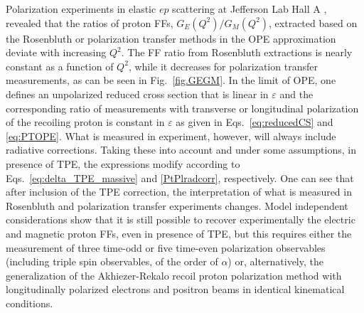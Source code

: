 Polarization experiments in elastic $ep$ scattering at Jefferson Lab Hall A \cite{JeffersonLabHallA:1999epl,Gayou:2001qt,Punjabi:2005wq,Puckett:2011xg}, revealed that the ratios of proton FFs, $G_E(Q^2)/G_M(Q^2)$, extracted based on the Rosenbluth \cite{Rosenbluth:1950yq} or polarization transfer methods \cite{Akhiezer:1968ek,Akhiezer:1974em} in the OPE approximation deviate with increasing $Q^2$. The FF ratio from Rosenbluth extractions is nearly constant as a function of $Q^2$, while it decreases for polarization transfer measurements, as can be seen in Fig.\ \ref{fig.GEGM}. In the limit of OPE, one defines an unpolarized reduced cross section that is linear in $\varepsilon$ and the corresponding ratio of measurements with transverse or longitudinal polarization of the recoiling proton is constant in $\varepsilon$  as given in Eqs.~\ref{eq:reducedCS} and \ref{eq:PTOPE}. What is measured in experiment, however, will always include radiative corrections. Taking these into account and under some assumptions, in presence of TPE, the expressions modify according to Eqs.~\ref{eq:delta_TPE_massive} and \ref{PtPlradcorr}, respectively.
One can see that after inclusion of the TPE correction, the interpretation of what is measured in Rosenbluth and polarization transfer experiments changes.  
Model independent considerations  \cite{Rekalo:2003xa,Rekalo:2003km,Rekalo:2004wa} show that it is still possible to recover experimentally the electric and magnetic proton FFs, even in presence of TPE, but this requires either the measurement of three time-odd or five time-even polarization observables (including triple spin observables, of the order of $\alpha$) or, alternatively, the generalization of the Akhiezer-Rekalo recoil proton polarization method  \cite{Akhiezer:1968ek,Akhiezer:1974em} with longitudinally polarized electrons and positron beams in identical kinematical conditions.


